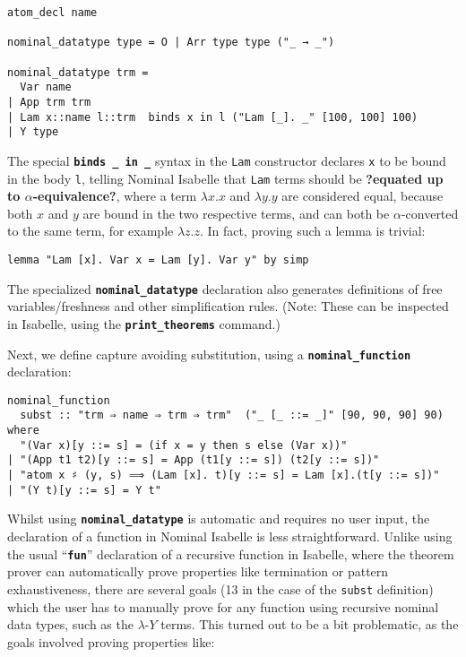 \documentclass[a4paper, 12pt, twoside]{style/ociamthesis}
\theoremstyle{plain}
\theoremstyle{definition}
\theoremstyle{remark}
\newcommand{\lamy}{\lambda\text{-}Y}
\begin{document}
\begin{verbatim}
atom_decl name

nominal_datatype type = O | Arr type type ("_ → _")

nominal_datatype trm =
  Var name
| App trm trm
| Lam x::name l::trm  binds x in l ("Lam [_]. _" [100, 100] 100)
| Y type
\end{verbatim}

The special \textbf{\texttt{binds \_ in \_}} syntax in the \texttt{Lam}
constructor declares \texttt{x} to be bound in the body \texttt{l},
telling Nominal Isabelle that \texttt{Lam} terms should be
\textbf{?equated up to \(\alpha\)-equivalence?}, where a term
\(\lambda x. x\) and \(\lambda y. y\) are considered equal, because both
\(x\) and \(y\) are bound in the two respective terms, and can both be
\(\alpha\)-converted to the same term, for example \(\lambda z .z\). In
fact, proving such a lemma is trivial:

\begin{verbatim}
lemma "Lam [x]. Var x = Lam [y]. Var y" by simp
\end{verbatim}

The specialized \textbf{\texttt{nominal\_datatype}} declaration also
generates definitions of free variables/freshness and other
simplification rules. (Note: These can be inspected in Isabelle, using
the \textbf{\texttt{print\_theorems}} command.)

Next, we define capture avoiding substitution, using a
\textbf{\texttt{nominal\_function}} declaration:

\begin{verbatim}
nominal_function
  subst :: "trm ⇒ name ⇒ trm ⇒ trm"  ("_ [_ ::= _]" [90, 90, 90] 90)
where
  "(Var x)[y ::= s] = (if x = y then s else (Var x))"
| "(App t1 t2)[y ::= s] = App (t1[y ::= s]) (t2[y ::= s])"
| "atom x ♯ (y, s) ⟹ (Lam [x]. t)[y ::= s] = Lam [x].(t[y ::= s])"
| "(Y t)[y ::= s] = Y t"
\end{verbatim}

Whilst using \textbf{\texttt{nominal\_datatype}} is automatic and
requires no user input, the declaration of a function in Nominal
Isabelle is less straightforward. Unlike using the usual
``\textbf{\texttt{fun}}'' declaration of a recursive function in
Isabelle, where the theorem prover can automatically prove properties
like termination or pattern exhaustiveness, there are several goals (13
in the case of the \texttt{subst} definition) which the user has to
manually prove for any function using recursive nominal data types, such
as the \(\lamy\) terms. This turned out to be a bit problematic, as the
goals involved proving properties like:
\end{document}
